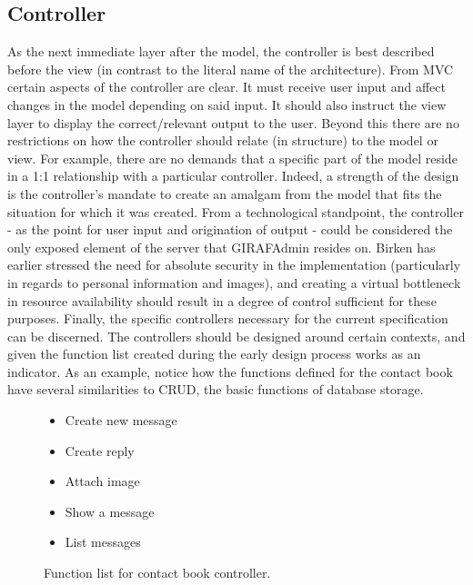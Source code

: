 \subsection{Controller}
As the next immediate layer after the model, the controller is best described before the view (in contrast to the literal name of the architecture).
From MVC certain aspects of the controller are clear. It must receive user input and affect changes in the model depending on said input. It should also instruct the view layer to display the correct/relevant output to the user.
Beyond this there are no restrictions on how the controller should relate (in structure) to the model or view. For example, there are no demands that a specific part of the model reside in a 1:1 relationship with a particular controller. Indeed, a strength of the design is the controller's mandate to create an amalgam from the model that fits the situation for which it was created.
From a technological standpoint, the controller - as the point for user input and origination of output - could be considered the only exposed element of the server that GIRAFAdmin resides on. Birken has earlier stressed the need for absolute security in the implementation (particularly in regards to personal information and images), and creating a virtual bottleneck in resource availability should result in a degree of control sufficient for these purposes.
Finally, the specific controllers necessary for the current specification can be discerned. The controllers should be designed around certain contexts, and given the function list created during the early design process works as an indicator. As an example, notice how the functions defined for the contact book have several similarities to CRUD, the basic functions of database storage.

\begin{figure}[ht]
	\begin{itemize}
		\item Create new message
		\item Create reply
		\item Attach image
		\item Show a message
		\item List messages
	\end{itemize}
	\caption{\label{fig_controller_cb}Function list for contact book controller.}
\end{figure}

